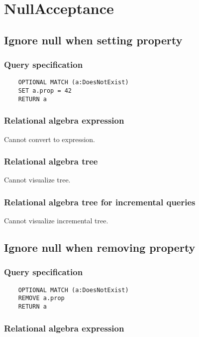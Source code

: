 	\section{NullAcceptance}

	\subsection{Ignore null when setting property}

	\subsubsection*{Query specification}

	\begin{lstlisting}
	OPTIONAL MATCH (a:DoesNotExist)
	SET a.prop = 42
	RETURN a
	\end{lstlisting}


	\subsubsection*{Relational algebra expression}

	Cannot convert to expression.

	\subsubsection*{Relational algebra tree}

	Cannot visualize tree.

	\subsubsection*{Relational algebra tree for incremental queries}

	Cannot visualize incremental tree.
	\subsection{Ignore null when removing property}

	\subsubsection*{Query specification}

	\begin{lstlisting}
	OPTIONAL MATCH (a:DoesNotExist)
	REMOVE a.prop
	RETURN a
	\end{lstlisting}


	\subsubsection*{Relational algebra expression}

